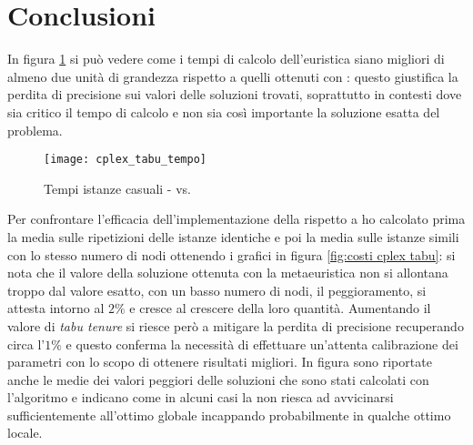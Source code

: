 \section{Conclusioni}

In figura \ref{fig:tempi cplex tabu} si può vedere come i tempi di calcolo dell'euristica \tabu siano migliori di almeno due unità di grandezza rispetto a quelli ottenuti con : questo giustifica la perdita di precisione sui valori delle soluzioni trovati, soprattutto in contesti dove sia critico il tempo di calcolo e non sia così importante la soluzione esatta del problema.

\begin{figure}[htb]
	\centering
	\texttt{[image: cplex\_tabu\_tempo]}
	\caption{Tempi istanze casuali -  vs. \tabu}
	\label{fig:tempi cplex tabu}
\end{figure}

Per confrontare l'efficacia dell'implementazione della \tabu rispetto a  ho calcolato prima la media sulle ripetizioni delle istanze identiche e poi la media sulle istanze simili con lo stesso numero di nodi ottenendo i grafici in figura \ref{fig:costi cplex tabu}: si nota che il valore della soluzione ottenuta con la metaeuristica non si allontana troppo dal valore esatto, con un basso numero di nodi, il peggioramento, si attesta intorno al $2\%$ e cresce al crescere della loro quantità.
Aumentando il valore di \emph{tabu tenure} si riesce però a mitigare la perdita di precisione recuperando circa l'$1\%$ e questo conferma la necessità di effettuare un'attenta calibrazione dei parametri con lo scopo di ottenere risultati migliori.
In figura sono riportate anche le medie dei valori peggiori delle soluzioni che sono stati calcolati con l'algoritmo e indicano come in alcuni casi la \tabu non riesca ad avvicinarsi sufficientemente all'ottimo globale incappando probabilmente in qualche ottimo locale.

